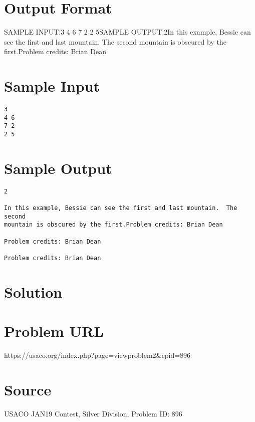 \documentclass[12pt]{article}
\begin{document}
\section*{Output Format}
SAMPLE INPUT:3
4 6
7 2
2 5SAMPLE OUTPUT:2In this example, Bessie can see the first and last mountain.  The second
mountain is obscured by the first.Problem credits: Brian Dean

\section*{Sample Input}
\begin{verbatim}
3
4 6
7 2
2 5
\end{verbatim}

\section*{Sample Output}
\begin{verbatim}
2

In this example, Bessie can see the first and last mountain.  The second
mountain is obscured by the first.Problem credits: Brian Dean

Problem credits: Brian Dean

Problem credits: Brian Dean
\end{verbatim}

\section*{Solution}


\section*{Problem URL}
https://usaco.org/index.php?page=viewproblem2&cpid=896

\section*{Source}
USACO JAN19 Contest, Silver Division, Problem ID: 896
\end{document}
